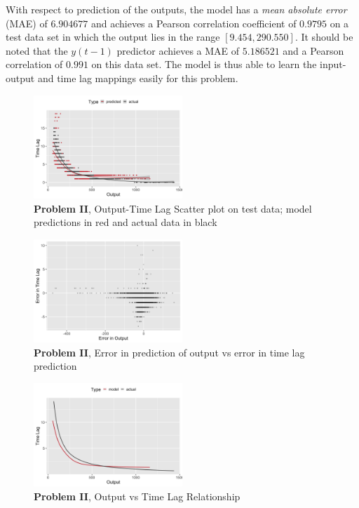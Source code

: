 \documentclass[twoside]{article}
\begin{document}
With respect to prediction of the outputs, the model has a \emph{mean absolute error} (MAE) of $6.904677$ and achieves a Pearson correlation coefficient of $0.9795$ on a test data set in which the output lies in the range $[9.454, 290.550]$. It should be noted that the $y(t - 1)$ predictor achieves a MAE of $5.186521$ and a Pearson correlation of $0.991$ on this data set. The model is thus able to learn the input-output and time lag mappings easily for this problem.

\begin{figure}[h]
\vspace{.3in}
\centerline{\includegraphics[width=0.5\textwidth]{figures/exp2_scatter_v_tl.png}}
\vspace{.3in}
\caption{\textbf{Problem II}, Output-Time Lag Scatter plot on test data; model predictions in red and actual data in black}
\label{fig:problem2_scatter}
\end{figure}

\begin{figure}[h]
\vspace{.3in}
\centerline{\includegraphics[width=0.5\textwidth]{figures/exp2_scatter_errors_test.png}}
\vspace{.3in}
\caption{\textbf{Problem II}, Error in prediction of output vs error in time lag prediction}
\label{fig:problem2_error}
\end{figure}

\begin{figure}[h]
\vspace{.3in}
\centerline{\includegraphics[width=0.5\textwidth]{figures/exp2_predictive_curves.png}}
\vspace{.3in}
\caption{\textbf{Problem II}, Output vs Time Lag Relationship}
\label{fig:problem2_curves}
\end{figure}
\end{document}
